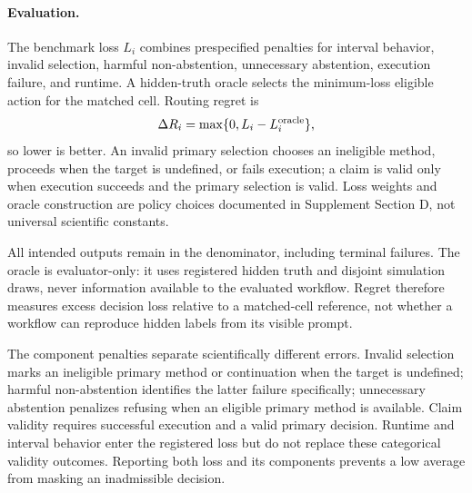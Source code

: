 \paragraph{Evaluation.}
The benchmark loss \(L_i\) combines prespecified penalties for interval
behavior, invalid selection, harmful non-abstention, unnecessary abstention,
execution failure, and runtime.  A hidden-truth oracle selects the
minimum-loss eligible action for the matched cell.  Routing regret is
\[
\Delta R_i=\max\{0,L_i-L_i^{\mathrm{oracle}}\},
\]
so lower is better.  An invalid primary selection chooses an ineligible
method, proceeds when the target is undefined, or fails execution; a claim is
valid only when execution succeeds and the primary selection is valid.  Loss
weights and oracle construction are policy choices documented in
Supplement Section D, not universal scientific constants.

All intended outputs remain in the denominator, including terminal failures.
The oracle is evaluator-only: it uses registered hidden truth and disjoint
simulation draws, never information available to the evaluated workflow.
Regret therefore measures excess decision loss relative to a matched-cell
reference, not whether a workflow can reproduce hidden labels from its visible
prompt.

The component penalties separate scientifically different errors.  Invalid
selection marks an ineligible primary method or continuation when the target
is undefined; harmful non-abstention identifies the latter failure
specifically; unnecessary abstention penalizes refusing when an eligible
primary method is available.  Claim validity requires successful execution and
a valid primary decision.  Runtime and interval behavior enter the registered
loss but do not replace these categorical validity outcomes.  Reporting both
loss and its components prevents a low average from masking an inadmissible
decision.
